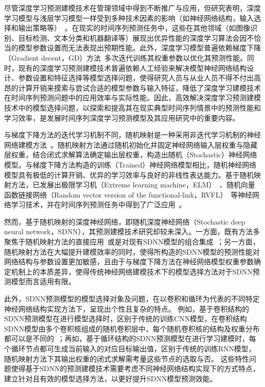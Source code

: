 尽管深度学习预测建模技术在管理领域中得到不断推广与应用，但研究表明，深度学习模型与浅层学习模型一样受到多种技术因素的影响（如神经网络结构，输入选择和输出策略等）~\cite{sezerFinancial2020,lindbergLongterm2019}。在现实的时间序列预测任务中，这些在其他领域（如图像识别、目标检测、文本分类和机器翻译等）展现出优异性能的深度学习算法会因不恰当的模型参数设置而无法表现出预期性能。此外，深度学习模型普遍依赖梯度下降（Gradient decent，GD）方法~\cite{sutskeverImportance2013,kingmaAdam2015,reddiConvergence2018,allen-zhuConvergence2019,loshchilovDecoupled2019}多次迭代训练其权重参数以优化其预测性能。同时，现有的深度学习预测建模技术普遍依赖人工经验来解决模型神经网络结构设计、参数设置和特征选择等模型选择问题，使得研究人员与从业人员不得不付出高昂的计算开销来摸索与尝试合适的模型参数与输入特征，降低了深度学习建模技术在时间序列预测问题中的应用效率与实际性能。因此，高效解决深度学习预测建模技术中的模型选择问题，以探索和提高其在现实典型时间序列情景中的预测性能和学习效率，是发展时间序列深度学习预测模型及其应用研究中的重要内容。

与梯度下降方法的迭代学习机制不同，随机映射是一种采用非迭代学习机制的神经网络建模方法~\cite{scardapaneRandomness2017,liInsights2017,wang2015jiyu,shen2018jiyu}。随机映射方法通过随机初始化并固定神经网络输入层权重与隐藏层权重，结合闭式求解算法确定输出层权重，构造出随机（Stochastic）神经网络模型。与梯度下降方法构造的训练（Trained）神经网络模型相比，随机神经网络模型具有极低的计算开销、优异的学习效率与良好的非线性表达能力。基于随机映射方法，已发展出极限学习机（Extreme learning machine，ELM）~\cite{shen2017jiyu}、随机向量函数链接网络（Random vector version of the functional-link，RVFL）~\cite{fu2021jiyu}等神经网络学习技术，并在时间序列预测任务中得到了广泛应用~\cite{scardapaneRandomness2017,caoReview2018,tanakaRecent2019}。

然而，基于随机映射的深度神经网络，即随机深度神经网络（Stochastic deep neural network，SDNN），其预测建模技术研究却较未深入。一方面，既有方法多聚焦于随机映射方法的直接应用~\cite{yuImpact2019,huForecasting2020,sunReview2020,hu2021jiyu}或是对现有SDNN模型的组合集成~\cite{wang2018effective,lv2018stacked,lv2019jiyu}；另一方面，随机映射方法在大幅提升建模效率的同时，使得所构造的SDNN模型的预测性能对网络结构与参数设置更加敏感，且由于与梯度下降方法在神经网络模型权重参数确定机制上的本质差异，使得传统神经网络建模技术下的模型选择方法对于SDNN预测模型而言适用有限。

此外，SDNN预测模型的模型选择对象及问题，在以卷积和循环为代表的不同特定神经网络结构实现方法下，呈现出个性且复杂的特点。
例如，基于卷积结构的SDNN预测模型在进行模型选择时，区别于传统的训练CNN模型，在卷积结构SDNN模型由多个卷积核组成的随机卷积层中，每个随机卷积核的结构及权重分布都可以是不同的~\cite{zhangErrorfeedback2021}；再如，基于循环结构的SDNN预测模型在进行学习建模时，每个循环节点都可生成当前输入的对应目标输出值，区别于传统的训练RNN模型，随机映射方法下其输出权重的闭式求解需考量这些节点的选取与否。
这些特性问题使得基于SDNN的预测建模技术需要考虑不同神经网络结构实现下的方式特点，建立针对且有效的模型选择方法，以更好提升SDNN模型预测效能。

